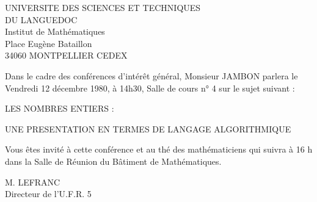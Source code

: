 \begin{center}
UNIVERSITE DES SCIENCES ET TECHNIQUES\\
DU LANGUEDOC\\
Institut de Mathématiques\\
Place Eugène Bataillon\\
34060 MONTPELLIER CEDEX
\end{center}

Dans le cadre des conférences d'intérêt général, Monsieur JAMBON parlera le Vendredi 12 décembre 1980, à 14h30, Salle de cours n° 4 sur le sujet suivant :

\begin{center}
LES NOMBRES ENTIERS :

UNE PRESENTATION EN TERMES DE LANGAGE ALGORITHMIQUE
\end{center}

Vous êtes invité à cette conférence et au thé des mathématiciens qui suivra à 16 h dans la Salle de Réunion du Bâtiment de Mathématiques.

M. LEFRANC\\
Directeur de l'U.F.R. 5
